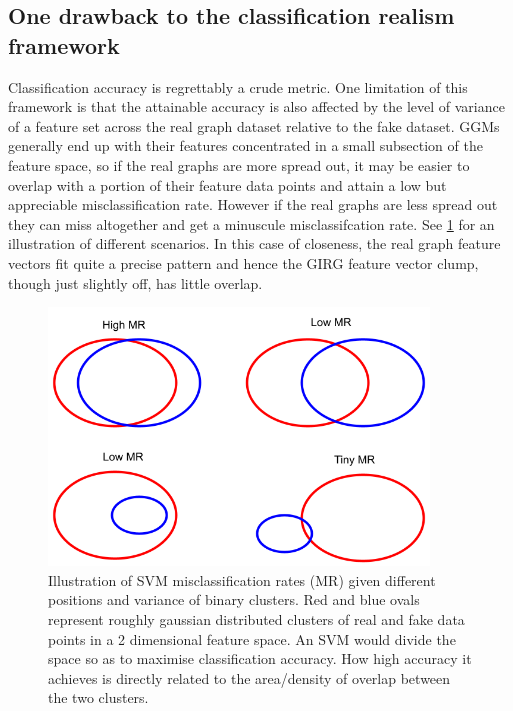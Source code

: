 \subsection{One drawback to the classification realism framework}
Classification accuracy is regrettably a crude metric. One limitation of this framework is that the attainable accuracy is also affected by the level of variance of a feature set across the real graph dataset relative to the fake dataset. GGMs generally end up with their features concentrated in a small subsection of the feature space, so if the real graphs are more spread out, it may be easier to overlap with a portion of their feature data points and attain a low but appreciable misclassification rate. However if the real graphs are less spread out they can miss altogether and get a minuscule misclassifcation rate. See \cref{fig:low_var_high_var_svm_clumps} for an illustration of different scenarios. In this case of closeness, the real graph feature vectors fit quite a precise pattern and hence the GIRG feature vector clump, though just slightly off, has little overlap.


\begin{figure}
    \centering
    \includegraphics[width=0.9\textwidth]{./figures/VennDiagram.png}
    \caption{Illustration of SVM misclassification rates (MR) given different positions and variance of binary clusters. Red and blue ovals represent roughly gaussian distributed clusters of real and fake data points in a 2 dimensional feature space. An SVM would divide the space so as to maximise classification accuracy. How high accuracy it achieves is directly related to the area/density of overlap between the two clusters.}
    \label{fig:low_var_high_var_svm_clumps}
\end{figure}

